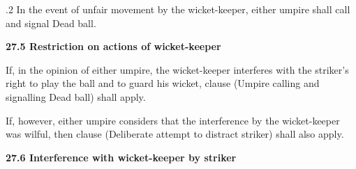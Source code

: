 \documentclass[12pt]{article}
\begin{document}
\vspace{\baselineskip}
{\fontsize{9pt}{10.8pt}.2 \tabto{0.49in} In the event of unfair movement by the wicket-keeper, either umpire shall call and signal Dead ball.\par}\par


\vspace{\baselineskip}
{\fontsize{11pt}{13.2pt}\selectfont \textbf{27.5 \tabto{0.47in} Restriction on actions of wicket-keeper}\par}\par


\vspace{\baselineskip}
\begin{adjustwidth}{0.0in}{0.12in}
{\fontsize{9pt}{10.8pt}\selectfont If, in the opinion of either umpire, the wicket-keeper interferes with the striker’s right to play the ball and to guard his wicket, clause (Umpire calling and signalling Dead ball) shall apply.\par}\par

\end{adjustwidth}


\vspace{\baselineskip}

\vspace{\baselineskip}

\vspace{\baselineskip}

\vspace{\baselineskip}
\begin{Center}
{\fontsize{8pt}{9.6pt}\par}
\end{Center}\par


\vspace{\baselineskip}

\vspace{\baselineskip}
\begin{adjustwidth}{0.0in}{0.64in}
{\fontsize{9pt}{10.8pt}\selectfont If, however, either umpire considers that the interference by the wicket-keeper was wilful, then clause  (Deliberate attempt to distract striker) shall also apply.\par}\par

\end{adjustwidth}


\vspace{\baselineskip}
{\fontsize{11pt}{13.2pt}\selectfont \textbf{27.6 \tabto{0.47in} Interference with wicket-keeper by striker}\par}\par
\end{document}
